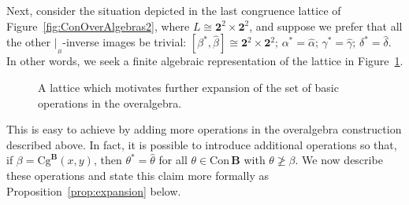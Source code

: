 \documentclass[cm,dissertation,actual,final]{uhthesis}
\theoremstyle{plain}
\theoremstyle{definition}
\newcounter{claim}
\theoremstyle{remark}
\numberwithin{theorem}{section}
\numberwithin{claim}{chapter}
\numberwithin{equation}{section}
\numberwithin{conjecture}{chapter}
\newcommand{\<}{\ensuremath{\langle}}
\renewcommand{\>}{\ensuremath{\rangle}}
\renewcommand{\ngeq}{\ensuremath{\ngeqslant}}
\newcommand{\Cg}{\ensuremath{\mathrm{Cg}}}
\newcommand{\Con}{\ensuremath{\mathrm{Con\,}}}
\newcommand{\0}{\ensuremath{\mathbf{0}}}
\newcommand{\1}{\ensuremath{\mathbf{1}}}
\newcommand{\2}{\ensuremath{\mathbf{2}}}
\newcommand{\3}{\ensuremath{\mathbf{3}}}
\newcommand{\4}{\ensuremath{\mathbf{4}}}
\newcommand{\5}{\ensuremath{\mathbf{5}}}
\newcommand{\bB}{\ensuremath{\mathbf{B}}}
\newcommand{\resB}{\ensuremath{|_{_B}}}
\newcommand{\two}{\ensuremath{\mathbf{2}}}
\begin{document}
Next, consider the situation depicted in the last congruence lattice of
Figure~\ref{fig:ConOverAlgebras2}, where 
$L \cong \two^2\times\two^2$, and
suppose we prefer that all the other $\resB$-inverse images be trivial:
$
[\beta^*,\widehat{\beta}]\cong \two^2\times\two^2; \,%
\alpha^*=\widehat{\alpha}; \, %
\gamma^*=\widehat{\gamma};\,  %
\delta^*=\widehat{\delta}.
$
In other words, we seek a finite algebraic
representation of the lattice in Figure~\ref{fig:ConOverAlgebras3}.
\begin{figure}[h!]
  \centering
  \caption{A lattice which motivates further expansion of the set of basic 
    operations in the overalgebra.}
  \label{fig:ConOverAlgebras3}
\end{figure}
This is easy to achieve by adding more operations in the overalgebra
construction described above.
In fact, it is possible to introduce additional operations
so that, if $\beta = \Cg^\bB(x,y)$, then $\theta^* = \widehat{\theta}$ for all
$\theta \in \Con\bB$ with $\theta \ngeq \beta$.   We now describe these
operations and state this claim more formally as
Proposition~\ref{prop:expansion} below.
\end{document}
